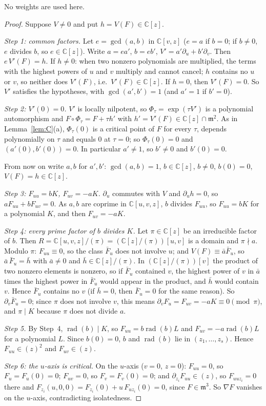 \documentclass[11pt]{article}
\newcommand{\C}{\mathbb{C}}
\theoremstyle{remark}
\begin{document}
No weights are used here.

\begin{proof}
Suppose $V\ne0$ and put $h=V(F)\in\C[z]$.

\emph{Step 1: common factors.} Let $e=\gcd(a,b)$ in $\C[v,z]$ ($e=a$ if $b=0$; if $b\ne0$, $e$ divides $b$, so $e\in\C[z]$). Write $a=ea'$, $b=eb'$, $V'=a'\partial_u+b'\partial_v$. Then $e\,V'(F)=h$. If $h\ne0$: when two nonzero polynomials are multiplied, the terms with the highest powers of $u$ and $v$ multiply and cannot cancel; $h$ contains no $u$ or $v$, so neither does $V'(F)$, i.e.\ $V'(F)\in\C[z]$. If $h=0$, then $V'(F)=0$. So $V'$ satisfies the hypotheses, with $\gcd(a',b')=1$ (and $a'=1$ if $b'=0$).

\emph{Step 2: $V'(0)=0$.} $V'$ is locally nilpotent, so $\Phi_\tau=\exp(\tau V')$ is a polynomial automorphism and $F\circ\Phi_\tau=F+\tau h'$ with $h'=V'(F)\in\C[z]\cap\mathfrak m^2$. As in Lemma~\ref{lem:C}(a), $\Phi_\tau(0)$ is a critical point of $F$ for every $\tau$, depends polynomially on $\tau$ and equals $0$ at $\tau=0$; so $\Phi_\tau(0)=0$ and $(a'(0),b'(0))=0$. In particular $a'\ne1$, so $b'\ne0$ and $b'(0)=0$.

From now on write $a,b$ for $a',b'$: $\gcd(a,b)=1$, $b\in\C[z]$, $b\ne0$, $b(0)=0$, $V(F)=h\in\C[z]$.

\emph{Step 3: $F_{uu}=bK$, $F_{uv}=-aK$.} $\partial_u$ commutes with $V$ and $\partial_uh=0$, so $aF_{uu}+bF_{uv}=0$. As $a,b$ are coprime in $\C[u,v,z]$, $b$ divides $F_{uu}$, so $F_{uu}=bK$ for a polynomial $K$, and then $F_{uv}=-aK$.

\emph{Step 4: every prime factor of $b$ divides $K$.} Let $\pi\in\C[z]$ be an irreducible factor of $b$. Then $R=\C[u,v,z]/(\pi)=(\C[z]/(\pi))[u,v]$ is a domain and $\pi\nmid a$. Modulo $\pi$: $F_{uu}\equiv0$, so the class $\bar F_u$ does not involve $u$; and $V(F)\equiv\bar a\bar F_u$, so $\bar a\,\bar F_u=\bar h$ with $\bar a\ne0$ and $\bar h\in\C[z]/(\pi)$. In $(\C[z]/(\pi))[v]$ the product of two nonzero elements is nonzero, so if $\bar F_u$ contained $v$, the highest power of $v$ in $\bar a$ times the highest power in $\bar F_u$ would appear in the product, and $\bar h$ would contain $v$. Hence $\bar F_u$ contains no $v$ (if $\bar h=0$, then $\bar F_u=0$ for the same reason). So $\partial_v\bar F_u=0$; since $\pi$ does not involve $v$, this means $\partial_vF_u=F_{uv}=-aK\equiv0\pmod\pi$, and $\pi\mid K$ because $\pi$ does not divide $a$.

\emph{Step 5.} By Step~4, $\operatorname{rad}(b)\mid K$, so $F_{uu}=b\operatorname{rad}(b)L$ and $F_{uv}=-a\operatorname{rad}(b)L$ for a polynomial $L$. Since $b(0)=0$, $b$ and $\operatorname{rad}(b)$ lie in $(z_1,\dots,z_s)$. Hence $F_{uu}\in(z)^2$ and $F_{uv}\in(z)$.

\emph{Step 6: the $u$-axis is critical.} On the $u$-axis ($v=0$, $z=0$): $F_{uu}=0$, so $F_u=F_u(0)=0$; $F_{uv}=0$, so $F_v=F_v(0)=0$; and $\partial_{z_i}F_{uu}\in(z)$, so $F_{uuz_i}=0$ there and $F_{z_i}(u,0,0)=F_{z_i}(0)+u\,F_{uz_i}(0)=0$, since $F\in\mathfrak m^3$. So $\nabla F$ vanishes on the $u$-axis, contradicting isolatedness.
\end{proof}
\end{document}
